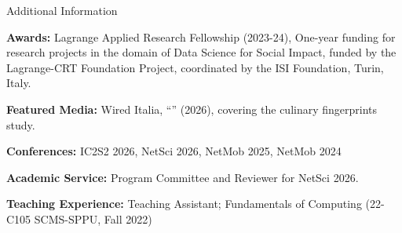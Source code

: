 \ifx\lang\eng
	\begin{rSection}{Additional Information}
        \item \textbf{Awards:} Lagrange Applied Research Fellowship (2023-24), One-year funding for research projects in the domain of Data Science for Social Impact, funded by the Lagrange-CRT Foundation Project, coordinated by the ISI Foundation, Turin, Italy.
        \item \textbf{Featured Media:} Wired Italia, ``'' (2026), covering the culinary fingerprints study.
		\item \textbf{Conferences:} IC2S2 2026, NetSci 2026, NetMob 2025, NetMob 2024
        \item \textbf{Academic Service:} Program Committee and Reviewer for NetSci 2026.
        \item \textbf{Teaching Experience:} Teaching Assistant; Fundamentals of Computing (22-C105 SCMS-SPPU, Fall 2022)
	\end{rSection}
\else
\fi
\vspace{-1em}